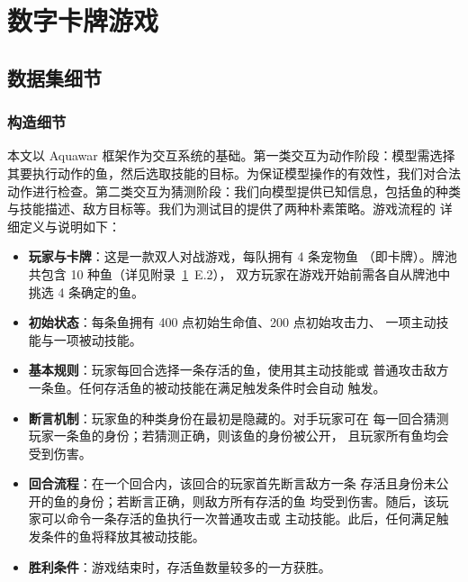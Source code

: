 
\section{数字卡牌游戏}\label{app:dcg}

\subsection{数据集细节}

\subsubsection*{构造细节}

本文以 Aquawar 框架作为交互系统的基础。第一类交互为动作阶段：模型需选择
其要执行动作的鱼，然后选取技能的目标。为保证模型操作的有效性，我们对合法
动作进行检查。第二类交互为猜测阶段：我们向模型提供已知信息，包括鱼的种类
与技能描述、敌方目标等。我们为测试目的提供了两种朴素策略。游戏流程的
详细定义与说明如下：

\begin{itemize}
    \item \textbf{玩家与卡牌}：这是一款双人对战游戏，每队拥有 4 条宠物鱼
          （即卡牌）。牌池共包含 10 种鱼（详见附录~\ref{app:dcg}~E.2），
          双方玩家在游戏开始前需各自从牌池中挑选 4 条确定的鱼。
    \item \textbf{初始状态}：每条鱼拥有 400 点初始生命值、200 点初始攻击力、
          一项主动技能与一项被动技能。
    \item \textbf{基本规则}：玩家每回合选择一条存活的鱼，使用其主动技能或
          普通攻击敌方一条鱼。任何存活鱼的被动技能在满足触发条件时会自动
          触发。
    \item \textbf{断言机制}：玩家鱼的种类身份在最初是隐藏的。对手玩家可在
          每一回合猜测玩家一条鱼的身份；若猜测正确，则该鱼的身份被公开，
          且玩家所有鱼均会受到伤害。
    \item \textbf{回合流程}：在一个回合内，该回合的玩家首先断言敌方一条
          存活且身份未公开的鱼的身份；若断言正确，则敌方所有存活的鱼
          均受到伤害。随后，该玩家可以命令一条存活的鱼执行一次普通攻击或
          主动技能。此后，任何满足触发条件的鱼将释放其被动技能。
    \item \textbf{胜利条件}：游戏结束时，存活鱼数量较多的一方获胜。
\end{itemize}

